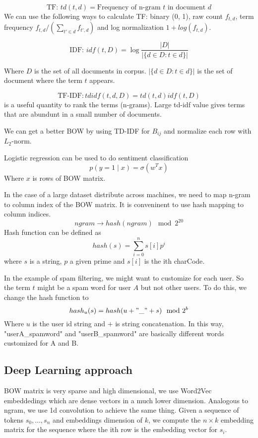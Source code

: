 \documentclass[twocolumn, 10pt]{article}
\begin{document}
$$ \mbox{TF: }  td(t, d) = \mbox{Frequency of n-gram  } t \mbox{ in document } d $$
We can use the following ways to calculate TF: binary (0, 1),  raw count $f_{t, d}$,  term frequency $f_{t,d} /  \left(\sum_{t' \in d} f_{t', d}\right)$ and log normalization $1+ log(f_{t, d})$.

$$\mbox{IDF: } idf(t, D) = \log{\frac{|D|}{|\{d \in D: t \in d \}|}} $$

Where $D$ is the set of all documents in corpus. $|\{d \in D: t \in d \}|$ is the set of document where the term $t$ appears.

$$\mbox{TF-IDF}: tdidf(t, d, D) = td(t, d) idf(t, D)$$
is a useful quantity to rank the terms (n-grams). Large td-idf value gives terms that are abundunt in a small number of documents. 

We can get a better BOW by using TD-IDF for $B_{ij}$ and normalize each row with $L_2$-norm.

Logistic regression can be used to do sentiment classification 
$$p(y = 1 \mid x) = \sigma(w^T x)$$ 
Where $x$ is rows of BOW matrix.

In the case of a large dataset distribute across machines, we need to map n-gram to column index of the BOW matrix. It is conveninent to use hash mapping to column indices.
$$ ngram \rightarrow hash(ngram) \mod 2^{20} $$
Hash function can be defined as 
$$ hash(s) = \sum_{i = 0}^n  s[i] p^i $$
where $s$ is a string, $p$ a given prime and $s[i]$ is the ith charCode.

In the example of spam filtering, we might want to customize for each user. So the term $t$ might be a spam word for user $A$ but not other users.  To do this, we change the hash function to 
$$ hash_u (s) = hash(u + "\_" + s) \mod 2^b$$
Where $u$ is the user id string and $+$ is string concatenation. In this way, "userA\_spamword" and "userB\_spamword" are basically different words customized for A and B.

\subsection*{Deep Learning approach}
BOW matrix is very sparse and high dimensional, we use Word2Vec embeddedings which are dense vectors in a much lower dimension.  Analogous to ngram, we use 1d convolution to achieve the same thing. Given a sequence of tokens $s_0, \ldots, s_n$ and embeddings dimension of $k$, we compute the $n\times k$ embedding matrix for the sequence where the ith row is the embedding vector for $s_i$. 
\end{document}
